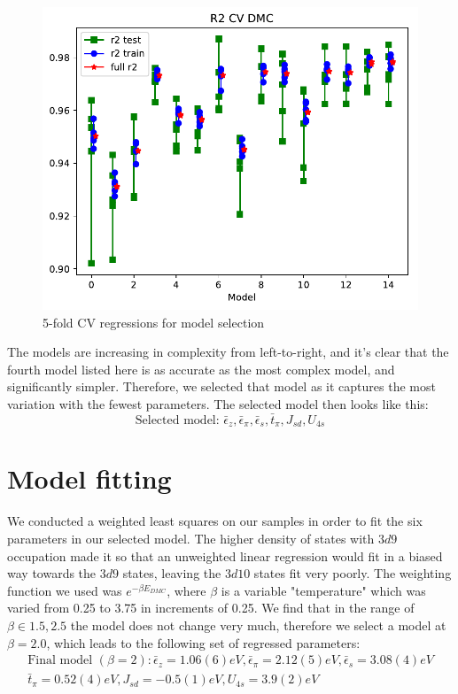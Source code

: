 \documentclass{article}
\begin{document}
\begin{figure}
\includegraphics[width=1.0\textwidth]{../qwalk/ub3lyp_s1_/analysis/cv_valid.pdf}
\caption{5-fold CV regressions for model selection}
\end{figure}

The models are increasing in complexity from left-to-right, and it's clear that the fourth model listed here is as accurate as the most complex model, and significantly simpler. Therefore, we selected that model as it captures the most variation with the fewest parameters. The selected model then looks like this: 
$$ \boxed{\text{Selected model: }\bar{\epsilon}_z, \bar{\epsilon}_\pi, \bar{\epsilon}_s, \bar{t}_\pi, J_{sd}, U_{4s}}$$

\section{Model fitting}
We conducted a weighted least squares on our samples in order to fit the six parameters in our selected model. The higher density of states with $3d9$ occupation made it so that an unweighted linear regression would fit in a biased way towards the $3d9$ states, leaving the $3d10$ states fit very poorly. The weighting function we used was $e^{-\beta E_{DMC}}$, where $\beta$ is a variable "temperature" which was varied from 0.25 to 3.75 in increments of 0.25. We find that in the range of $\beta \in {1.5, 2.5}$ the model does not change very much, therefore we select a model at $\beta = 2.0$, which leads to the following set of regressed parameters:
\begin{multline}
 \boxed{\text{Final model }  (\beta=2): \bar{\epsilon}_z = 1.06(6) eV, \bar{\epsilon}_\pi = 2.12(5) eV, \bar{\epsilon}_s = 3.08(4) eV}\\
\boxed{\bar{t}_\pi = 0.52(4) eV, J_{sd} = -0.5(1) eV, U_{4s} = 3.9(2) eV}
\end{multline}
\end{document}
